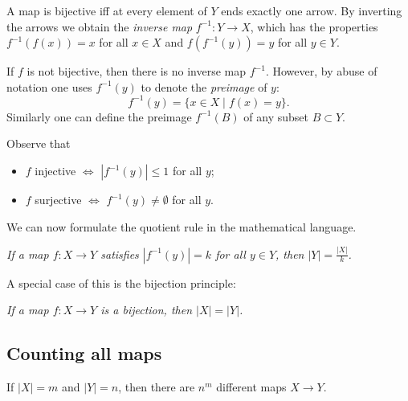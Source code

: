 \begin{page}
\setcounter{section}{2}
\setcounter{subsection}{2}
\setcounter{dfn}{1}
\label{portion:23}


A map is bijective iff at every element of $Y$ ends exactly one arrow.
By inverting the arrows we obtain the \emph{inverse map} $f^{-1} \colon Y \to X$,
which has the properties $f^{-1}(f(x)) = x$ for all $x \in X$ and $f(f^{-1}(y)) = y$ for all $y \in Y$.

If $f$ is not bijective, then there is no inverse map $f^{-1}$.
However, by abuse of notation one uses $f^{-1}(y)$ to denote the \emph{preimage} of $y$:
\[
f^{-1}(y) = \{x \in X \mid f(x) = y\}.
\]
Similarly one can define the preimage $f^{-1}(B)$ of any subset $B \subset Y$.

Observe that
\begin{itemize}
\item
$f$ injective $\Leftrightarrow$ $|f^{-1}(y)| \le 1$ for all $y$;
\item
$f$ surjective $\Leftrightarrow$ $f^{-1}(y) \ne \emptyset$ for all $y$.
\end{itemize}

We can now formulate the quotient rule in the mathematical language.

\begin{center}
\parbox{.75\textwidth}{\emph{If a map $f \colon X \to Y$ satisfies $|f^{-1}(y)| = k$ for all $y \in Y$, then $|Y| = \frac{|X|}{k}$.}}
\end{center}

A special case of this is the bijection principle:
\begin{center}
\parbox{.75\textwidth}{\emph{If a map $f \colon X \to Y$ is a bijection, then $|X| = |Y|$.}}
\end{center}



\end{page}

\begin{page}
\setcounter{section}{2}
\setcounter{subsection}{2}
\setcounter{dfn}{1}
\label{portion:24}

\subsection{Counting all maps}

\end{page}

\begin{page}
\setcounter{section}{2}
\setcounter{subsection}{2}
\setcounter{dfn}{2}
\label{portion:26}

\begin{thm}
\label{thm:AllMaps}
If $|X| = m$ and $|Y| = n$, then there are $n^m$ different maps $X \to Y$.
\end{thm}

\end{page}

